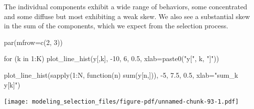 \documentclass[
  letterpaper,
  DIV=11,
  numbers=noendperiod]{scrartcl}
\newenvironment{Shaded}{\begin{snugshade}}{\end{snugshade}}
\newcommand{\AttributeTok}[1]{\textcolor[rgb]{0.40,0.45,0.13}{#1}}
\newcommand{\ControlFlowTok}[1]{\textcolor[rgb]{0.00,0.23,0.31}{#1}}
\newcommand{\DecValTok}[1]{\textcolor[rgb]{0.68,0.00,0.00}{#1}}
\newcommand{\FloatTok}[1]{\textcolor[rgb]{0.68,0.00,0.00}{#1}}
\newcommand{\FunctionTok}[1]{\textcolor[rgb]{0.28,0.35,0.67}{#1}}
\newcommand{\NormalTok}[1]{\textcolor[rgb]{0.00,0.23,0.31}{#1}}
\newcommand{\OtherTok}[1]{\textcolor[rgb]{0.00,0.23,0.31}{#1}}
\newcommand{\SpecialCharTok}[1]{\textcolor[rgb]{0.37,0.37,0.37}{#1}}
\newcommand{\StringTok}[1]{\textcolor[rgb]{0.13,0.47,0.30}{#1}}
\begin{document}
\begin{Shaded}
\end{Shaded}

The individual components exhibit a wide range of behaviors, some
concentrated and some diffuse but most exhibiting a weak skew. We also
see a substantial skew in the sum of the components, which we expect
from the selection process.

\begin{Shaded}
\begin{Highlighting}[]
\FunctionTok{par}\NormalTok{(}\AttributeTok{mfrow=}\FunctionTok{c}\NormalTok{(}\DecValTok{2}\NormalTok{, }\DecValTok{3}\NormalTok{))}

\ControlFlowTok{for}\NormalTok{ (k }\ControlFlowTok{in} \DecValTok{1}\SpecialCharTok{:}\NormalTok{K)}
  \FunctionTok{plot\_line\_hist}\NormalTok{(y[,k], }\SpecialCharTok{{-}}\DecValTok{10}\NormalTok{, }\DecValTok{6}\NormalTok{, }\FloatTok{0.5}\NormalTok{, }\AttributeTok{xlab=}\FunctionTok{paste0}\NormalTok{(}\StringTok{"y["}\NormalTok{, k, }\StringTok{"]"}\NormalTok{))}

\FunctionTok{plot\_line\_hist}\NormalTok{(}\FunctionTok{sapply}\NormalTok{(}\DecValTok{1}\SpecialCharTok{:}\NormalTok{N, }\ControlFlowTok{function}\NormalTok{(n) }\FunctionTok{sum}\NormalTok{(y[n,])),}
               \SpecialCharTok{{-}}\DecValTok{5}\NormalTok{, }\FloatTok{7.5}\NormalTok{, }\FloatTok{0.5}\NormalTok{, }\AttributeTok{xlab=}\StringTok{"sum\_k y[k]"}\NormalTok{)}
\end{Highlighting}
\end{Shaded}

\texttt{[image: modeling\_selection\_files/figure-pdf/unnamed-chunk-93-1.pdf]}
\end{document}

